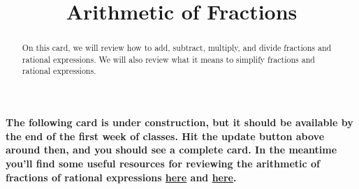 \documentclass{ximera}
\title[Dig-In:]{Arithmetic of Fractions}
\begin{document}
\begin{abstract}
On this card, we will review how to add, subtract, multiply, and divide fractions and rational expressions.  We will also review what it means to simplify fractions and rational expressions.
\end{abstract}
\maketitle

\textbf{The following card is under construction, but it should be available by the end of the first week of classes.  Hit the update button above around then, and you should see a complete card.  In the meantime you'll find some useful resources for reviewing the arithmetic of fractions of rational expressions \href{https://www.khanacademy.org/math/arithmetic/fraction-arithmetic}{here} and \href{https://www.khanacademy.org/math/algebra2/rational-expressions-equations-and-functions}{here}.}
\end{document}
